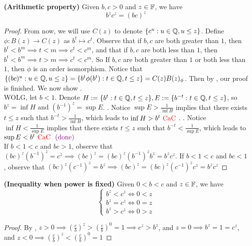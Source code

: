 \documentclass{report}
\begin{document}
\begin{theorem}
\label{1.4.9}
\textbf{(Arithmetic property)} Given $b,c>0$ and  $z\in\mathbb{F}$, we have
\begin{equation}
b^zc^z=(bc)^z
\end{equation}
\end{theorem}
\begin{proof}
 From now, we will use $C(z)$ to denote $\{ c^u: u\in\mathbb{Q}, u\leq z \}$. Define $\phi :B(z)\rightarrow C(z)$ as $b^t\mapsto c^t$. Observe that if $b,c$ are both greater than $1$, then  $b^t<b^m\implies t<m\implies c^t<c^m$, and that if $b,c$ are both less than $1$, then  $b^t<b^m\implies t>m\implies c^t<c^m$. So If $b,c$ are both greater than $1$ or both less than $1$,  then $\phi$ is an order isomorphism. Notice that $\{ (bc)^u:u\in\mathbb{Q}, u\leq z \}=\{ b^t \phi(b^t):t\in\mathbb{Q}, t\leq z \}=C(z)B(z)_\phi$. Then by , our proof is finished. We now show .\\

WOLG, let $b<1$. Denote $H:=\{ b^t:t\in\mathbb{Q},t\leq z \},E:=\{ b^{-t}:t\in\mathbb{Q},t\leq z \}$, so $b^z=\inf H\text{ and }(b^{-1})^z=\sup E$. . Notice $\sup E>\frac{1}{\inf H}$ implies that there exists $t\leq z$ such that $b^{-t}>\frac{1}{\inf H}$, which leads to $\inf H>b^t\text{ \textcolor{red}{CaC} }$. . Notice $\inf H<\frac{1}{\sup E}$ implies that there exists $t\leq z$ such that $b^{-t}<\frac{1}{\sup E}$, which leads to $\sup E<b^t\text{ \textcolor{red}{CaC} }\textcolor{violet}{\text{ (done) }}$\\     

 If $b<1<c$ and $bc>1$, observe that $(bc)^z(b^{-1})^z=c^z\implies (bc)^z=(bc)^z(b^{-1})^zb^z=b^zc^z$. If $b<1<c$ and  $bc<1$, observe that $(bc)^z(c^{-1})^z=b^z\implies (bc)^z=(bc)^z(c^{-1})^zc^z=b^zc^z $  
\end{proof}
\begin{theorem}
\label{1.4.10}
\textbf{(Inequality when power is fixed)} Given $0<b<c$ and  $z\in\mathbb{F}$, we have
\begin{equation}
\begin{cases}
  b^z<c^z \iff 0<z\\
  b^z=c^z \iff 0=z\\
  b^z>c^z\iff 0>z
\end{cases}
\end{equation}
\end{theorem}
\begin{proof}
By , $z>0\implies (\frac{c}{b})^z>(\frac{c}{b})^0=1\implies c^z>b^z$, and $z=0\implies b^z=1=c^z$, and $z<0\implies (\frac{c}{b})^z<(\frac{c}{b})^0=1$ 
\end{proof}
\end{document}
